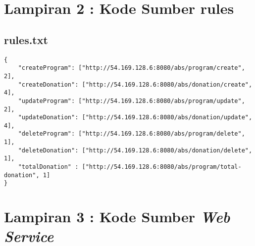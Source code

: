 \chapter*{Lampiran 2 : Kode Sumber rules}
\section*{rules.txt}
\begin{lstlisting}[caption={Berkas \co{compute.xml}},label={lst:excomp}]
{
	"createProgram": ["http://54.169.128.6:8080/abs/program/create", 2],
	"createDonation": ["http://54.169.128.6:8080/abs/donation/create", 4],
	"updateProgram": ["http://54.169.128.6:8080/abs/program/update", 2],
	"updateDonation": ["http://54.169.128.6:8080/abs/donation/update", 4],
	"deleteProgram": ["http://54.169.128.6:8080/abs/program/delete", 1],
	"deleteDonation": ["http://54.169.128.6:8080/abs/donation/delete", 1],
	"totalDonation" : ["http://54.169.128.6:8080/abs/program/total-donation", 1]
}
\end{lstlisting}

\chapter*{Lampiran 3 : Kode Sumber \textit{Web Service}}
